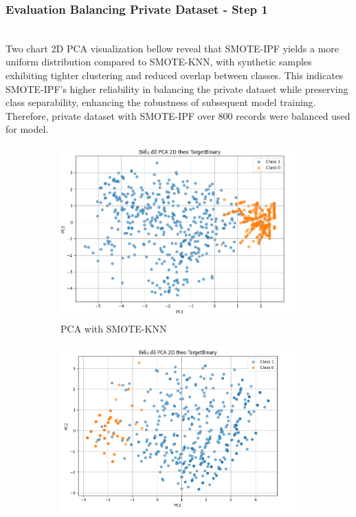 \documentclass[conference]{IEEEtran}
\begin{document}
\subsubsection{Evaluation Balancing Private Dataset - Step 1}\mbox{}\\
Two chart 2D PCA visualization bellow reveal that SMOTE-IPF yields a more uniform distribution compared to SMOTE-KNN, with synthetic samples exhibiting tighter clustering and reduced overlap between classes. This indicates SMOTE-IPF’s higher reliability in balancing the private dataset while preserving class separability, enhancing the robustness of subsequent model training.\\
Therefore, private dataset with SMOTE-IPF over 800 records were balanced used for model.

\begin{figure}[H]
    \centering
    \begin{subfigure}[b]{0.48\linewidth}
        \includegraphics[width=\linewidth]{images/pca_smote_knn.png}
        \caption{PCA with SMOTE-KNN}
        \label{fig:pca-smote-knn}
    \end{subfigure}
    \hfill
    \begin{subfigure}[b]{0.48\linewidth}
        \includegraphics[width=\linewidth]{images/pca_smote_ipf.png}

\end{subfigure}
\end{figure}
\end{document}
